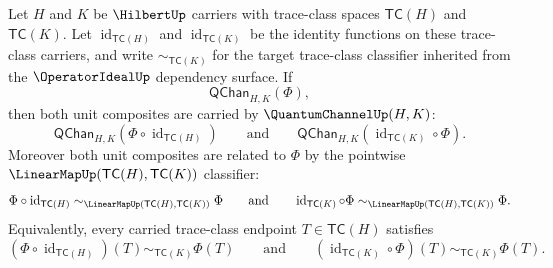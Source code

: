 \begin{theorem}
\label{thm:quantumchannel-identity-composition-unit-laws}
Let $H$ and $K$ be $\HilbertUp$ carriers with trace-class spaces $\mathsf{TC}(H)$ and $\mathsf{TC}(K)$. Let $\operatorname{id}_{\mathsf{TC}(H)}$ and $\operatorname{id}_{\mathsf{TC}(K)}$ be the identity functions on these trace-class carriers, and write $\sim_{\mathsf{TC}(K)}$ for the target trace-class classifier inherited from the $\OperatorIdealUp$ dependency surface. If
$$
\mathsf{QChan}_{H,K}(\Phi),
$$
then both unit composites are carried by $\QuantumChannelUp(H,K)$:
$$
\mathsf{QChan}_{H,K}(\Phi\circ\operatorname{id}_{\mathsf{TC}(H)})
\qquad\text{and}\qquad
\mathsf{QChan}_{H,K}(\operatorname{id}_{\mathsf{TC}(K)}\circ\Phi).
$$
Moreover both unit composites are related to $\Phi$ by the pointwise $\LinearMapUp(\mathsf{TC}(H),\mathsf{TC}(K))$ classifier:
$$
\Phi\circ\operatorname{id}_{\mathsf{TC}(H)}
\sim_{\LinearMapUp(\mathsf{TC}(H),\mathsf{TC}(K))}
\Phi
\qquad\text{and}\qquad
\operatorname{id}_{\mathsf{TC}(K)}\circ\Phi
\sim_{\LinearMapUp(\mathsf{TC}(H),\mathsf{TC}(K))}
\Phi.
$$
Equivalently, every carried trace-class endpoint $T\in\mathsf{TC}(H)$ satisfies
$$
(\Phi\circ\operatorname{id}_{\mathsf{TC}(H)})(T)
\sim_{\mathsf{TC}(K)}
\Phi(T)
\qquad\text{and}\qquad
(\operatorname{id}_{\mathsf{TC}(K)}\circ\Phi)(T)
\sim_{\mathsf{TC}(K)}
\Phi(T).
$$
\end{theorem}
